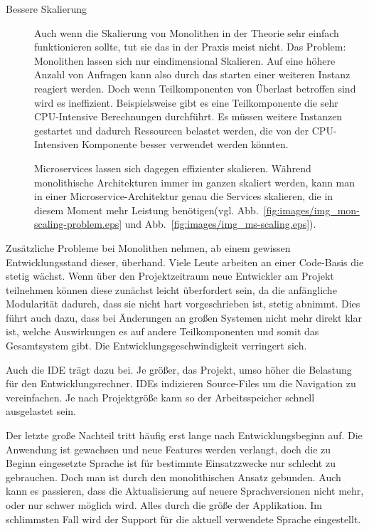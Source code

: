 \documentclass[12pt,a4paper,bibliography=totocnumbered,listof=totocnumbered]{scrartcl}
\begin{document}
\begin{description}
	\item[Bessere Skalierung] Auch wenn die Skalierung von Monolithen in der Theorie sehr einfach funktionieren sollte, tut sie das in der Praxis meist nicht. Das Problem: Monolithen lassen sich nur eindimensional Skalieren. Auf eine höhere Anzahl von Anfragen kann also durch das starten einer weiteren Instanz reagiert werden. Doch wenn Teilkomponenten von Überlast betroffen sind wird es ineffizient. Beispielsweise gibt es eine Teilkomponente die sehr CPU-Intensive Berechnungen durchführt. Es müssen weitere Instanzen gestartet und dadurch Ressourcen belastet werden, die von der CPU-Intensiven Komponente besser verwendet werden könnten.
	
	
	Microservices lassen sich dagegen effizienter skalieren. Während monolithische Architekturen immer im ganzen skaliert werden, kann man in einer Microservice-Architektur genau die Services skalieren, die in diesem Moment mehr Leistung benötigen(vgl. Abb.~\ref{fig:images/img_mon-scaling-problem.eps} und Abb.~\ref{fig:images/img_ms-scaling.eps}).
	
	
	
\end{description}

Zusätzliche Probleme bei Monolithen nehmen, ab einem gewissen Entwicklungsstand dieser, überhand. Viele Leute arbeiten an einer Code-Basis die stetig wächst. Wenn über den Projektzeitraum neue Entwickler am Projekt teilnehmen können diese zunächst leicht überfordert sein, da die anfängliche Modularität dadurch, dass sie nicht hart vorgeschrieben ist, stetig abnimmt. Dies führt auch dazu, dass bei Änderungen an großen Systemen nicht mehr direkt klar ist, welche Auswirkungen es auf andere Teilkomponenten und somit das Gesamtsystem gibt. Die Entwicklungsgeschwindigkeit verringert sich.

Auch die IDE trägt dazu bei. Je größer, das Projekt, umso höher die Belastung für den Entwicklungsrechner. IDEs indizieren Source-Files um die Navigation zu vereinfachen. Je nach Projektgröße kann so der Arbeitsspeicher schnell ausgelastet sein.

Der letzte große Nachteil tritt häufig erst lange nach Entwicklungsbeginn auf. Die Anwendung ist gewachsen und neue Features werden verlangt, doch die zu Beginn eingesetzte Sprache ist für bestimmte Einsatzzwecke nur schlecht zu gebrauchen. Doch man ist durch den monolithischen Ansatz gebunden. Auch kann es passieren, dass die Aktualisierung auf neuere Sprachversionen nicht mehr, oder nur schwer möglich wird. Alles durch die größe der Applikation. Im schlimmsten Fall wird der Support für die aktuell verwendete Sprache eingestellt.\cite{richardson}
\end{document}
